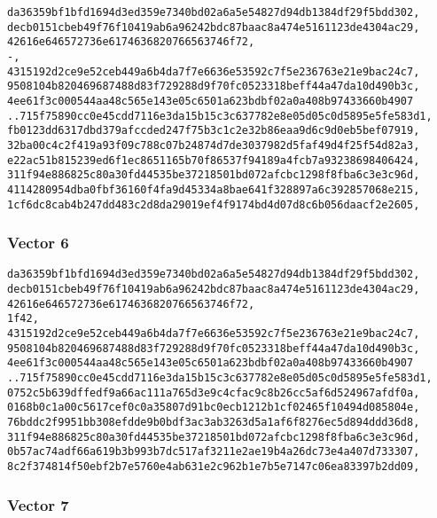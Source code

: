 \documentclass[
]{article}
\begin{document}
\begin{verbatim}
da36359bf1bfd1694d3ed359e7340bd02a6a5e54827d94db1384df29f5bdd302,
decb0151cbeb49f76f10419ab6a96242bdc87baac8a474e5161123de4304ac29,
42616e646572736e6174636820766563746f72,
-,
4315192d2ce9e52ceb449a6b4da7f7e6636e53592c7f5e236763e21e9bac24c7,
9508104b820469687488d83f729288d9f70fc0523318beff44a47da10d490b3c,
4ee61f3c000544aa48c565e143e05c6501a623bdbf02a0a408b97433660b4907
..715f75890cc0e45cdd7116e3da15b15c3c637782e8e05d05c0d5895e5fe583d1,
fb0123dd6317dbd379afccded247f75b3c1c2e32b86eaa9d6c9d0eb5bef07919,
32ba00c4c2f419a93f09c788c07b24874d7de3037982d5faf49d4f25f54d82a3,
e22ac51b815239ed6f1ec8651165b70f86537f94189a4fcb7a93238698406424,
311f94e886825c80a30fd44535be37218501bd072afcbc1298f8fba6c3e3c96d,
4114280954dba0fbf36160f4fa9d45334a8bae641f328897a6c392857068e215,
1cf6dc8cab4b247dd483c2d8da29019ef4f9174bd4d07d8c6b056daacf2e2605,
\end{verbatim}

\hypertarget{vector-6-1}{%
\subsubsection{Vector 6}\label{vector-6-1}}

\begin{verbatim}
da36359bf1bfd1694d3ed359e7340bd02a6a5e54827d94db1384df29f5bdd302,
decb0151cbeb49f76f10419ab6a96242bdc87baac8a474e5161123de4304ac29,
42616e646572736e6174636820766563746f72,
1f42,
4315192d2ce9e52ceb449a6b4da7f7e6636e53592c7f5e236763e21e9bac24c7,
9508104b820469687488d83f729288d9f70fc0523318beff44a47da10d490b3c,
4ee61f3c000544aa48c565e143e05c6501a623bdbf02a0a408b97433660b4907
..715f75890cc0e45cdd7116e3da15b15c3c637782e8e05d05c0d5895e5fe583d1,
0752c5b639dffedf9a66ac111a765d3e9c4cfac9c8b26cc5af6d524967afdf0a,
0168b0c1a00c5617cef0c0a35807d91bc0ecb1212b1cf02465f10494d085804e,
76bddc2f9951bb308efdde9b0bdf3ac3ab3263d5a1af6f8276ec5d894ddd36d8,
311f94e886825c80a30fd44535be37218501bd072afcbc1298f8fba6c3e3c96d,
0b57ac74adf66a619b3b993b7dc517af3211e2ae19b4a26dc73e4a407d733307,
8c2f374814f50ebf2b7e5760e4ab631e2c962b1e7b5e7147c06ea83397b2dd09,
\end{verbatim}

\hypertarget{vector-7-1}{%
\subsubsection{Vector 7}\label{vector-7-1}}
\end{document}
